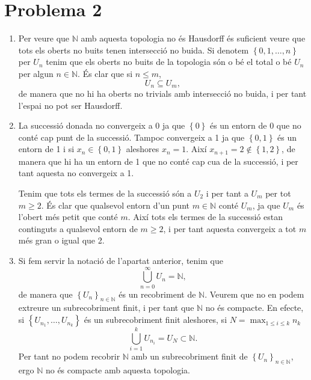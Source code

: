 \documentclass[12pt]{article}
\numberwithin{table}{section}
\numberwithin{figure}{section}
\numberwithin{equation}{section}
\newcommand{\N}{\mathbb{N}}
\newcommand{\set}[1]{\left\{ #1\right\}}
\begin{document}
\section*{Problema 2}
\begin{enumerate}[label=(\alph*), font=\bfseries \sffamily, wide, labelwidth=!, labelindent=0pt]
	\item Per veure que \( \N \) amb aquesta topologia no és Hausdorff és suficient veure que tots els oberts no buits tenen intersecció no buida. Si denotem \( \set{0,1,\dots,n} \) per \( U_n \) tenim que els oberts no buits de la topologia són o bé el total o bé \( U_n \) per algun \( n \in \N \). És clar que si \( n \leq m \), 
		\begin{equation*}
			U_n \subseteq U_m,
		\end{equation*}	
		de manera que no hi ha oberts no trivials amb intersecció no buida, i per tant l'espai no pot ser Hausdorff. 	

	\item La successió donada no convergeix a 0 ja que \( \set{0} \) és un entorn de 0 que no conté cap punt de la successió. Tampoc convergeix a 1 ja que \( \set{0,1} \) és un entorn de 1 i si \( x_n \in \set{0,1} \) aleshores \( x_{n} = 1 \). Així \( x_{n+1} = 2 \notin \set{1,2} \), de manera que hi ha un entorn de 1 que no conté cap cua de la successió, i per tant aquesta no convergeix a 1. 

		Tenim que tots els termes de la successió són a \( U_2 \) i per tant a \( U_m \) per tot \( m \geq 2 \). És clar que qualsevol entorn d'un punt \( m \in \N \) conté \( U_m \), ja que \( U_m \) és l'obert més petit que conté \( m \). Així tots els termes de la successió estan continguts a qualsevol entorn de \( m \geq 2 \), i per tant aquesta convergeix a tot \( m \) més gran o igual que 2.

	\item Si fem servir la notació de l'apartat anterior, tenim que 
		\begin{equation*}
			\bigcup_{n = 0}^\infty U_n = \N,
		\end{equation*}
		de manera que \( \set{U_n}_{n \in \N} \) és un recobriment de \( \N \). Veurem que no en podem extreure un subrecobriment finit, i per tant que \( \N \) no és compacte. En efecte, si \( \set{U_{n_1}, \dots, U_{n_k}} \) és un subrecobriment finit aleshores, si \( N = \max_{1 \leq i \leq k} n_k \)
		\begin{equation*}
			\bigcup_{i = 1}^k U_{n_i} = U_N \subset \N.
		\end{equation*}
		Per tant no podem recobrir \( \N \) amb un subrecobriment finit de \( \set{U_n}_{n \in \N} \), ergo \( \N \) no és compacte amb aquesta topologia. 
\end{enumerate}
\end{document}
